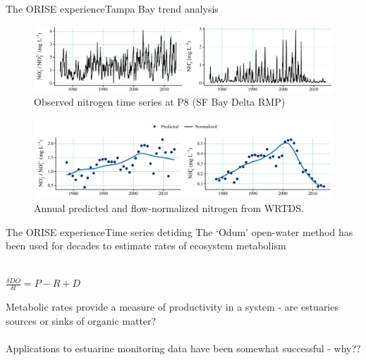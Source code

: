 \documentclass[serif]{beamer}\usepackage[]{graphicx}\usepackage[]{color}
\begin{document}
\begin{frame}{The ORISE experience}{Tampa Bay trend analysis}
\onslide<+->
\begin{figure}
\centerline{\includegraphics[width = \textwidth]{fig/p8obs.pdf}}
\caption{Observed nitrogen time series at P8 (SF Bay Delta RMP)}
\end{figure}
\onslide<+->
\vspace{-0.35in}
\begin{figure}
\centerline{\includegraphics[width = \textwidth]{fig/p8prdnrm.pdf}}
\caption{Annual predicted and flow-normalized nitrogen from WRTDS.}
\end{figure}
\end{frame}

\begin{frame}{The ORISE experience}{Time series detiding}
The `Odum' open-water method has been used for decades to estimate rates of ecosystem metabolism \scriptsize \cite{Odum56} \\~\\
\normalsize
\begin{center}
$\frac{\delta DO}{\delta t} = P - R + D$
\end{center}
Metabolic rates provide a measure of productivity in a system - are estuaries sources or sinks of organic matter? \scriptsize \cite{Caffrey14}
\normalsize \\~\\
Applications to estuarine monitoring data have been somewhat successful - why?? 
\end{frame}
\end{document}
